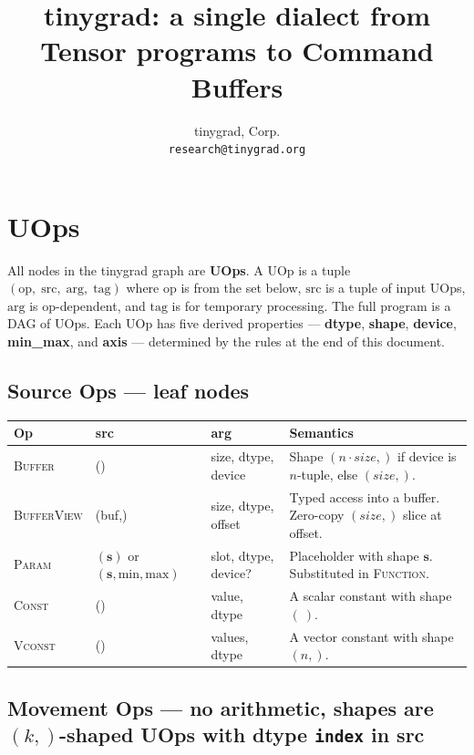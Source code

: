 \documentclass[10pt,letterpaper]{article}
\title{tinygrad: a single dialect from Tensor programs to Command Buffers}
\author{tinygrad, Corp. \\ \texttt{research@tinygrad.org}}
\date{}
\newcommand{\op}[1]{\textsc{#1}}
\begin{document}
\maketitle
\thispagestyle{empty}

\section*{UOps}

All nodes in the tinygrad graph are \textbf{UOps}. A UOp is a tuple $(\mathrm{op},\;\mathrm{src},\;\mathrm{arg},\;\mathrm{tag})$ where $\mathrm{op}$ is from the set below, $\mathrm{src}$ is a tuple of input UOps, $\mathrm{arg}$ is op-dependent, and $\mathrm{tag}$ is for temporary processing. The full program is a DAG of UOps. Each UOp has five derived properties --- \textbf{dtype}, \textbf{shape}, \textbf{device}, \textbf{min\_max}, and \textbf{axis} --- determined by the rules at the end of this document.

\subsection*{Source Ops \normalfont\small--- leaf nodes}

\begin{tabular}{@{}l l l l@{}}
\toprule
\textbf{Op} & \textbf{src} & \textbf{arg} & \textbf{Semantics} \\
\midrule
\op{Buffer} & () & size, dtype, device &
  Shape $(n \cdot \textit{size},)$ if device is $n$-tuple, else $(\textit{size},)$. \\
\op{BufferView} & (buf,) & size, dtype, offset &
  Typed access into a buffer. Zero-copy $(\textit{size},)$ slice at offset. \\
\op{Param} & $(\mathbf{s})$ or $(\mathbf{s}, \text{min}, \text{max})$ & slot, dtype, device? &
  Placeholder with shape $\mathbf{s}$. Substituted in \op{Function}. \\[4pt]
\op{Const} & () & value, dtype &
  A scalar constant with shape $(\ )$. \\
\op{Vconst} & () & values, dtype &
  A vector constant with shape $(n,)$. \\
\bottomrule
\end{tabular}

\subsection*{{\color{movgreen}Movement Ops} \normalfont\small--- no arithmetic, shapes are $(k,)$-shaped UOps with dtype \texttt{index} in src}
\end{document}
